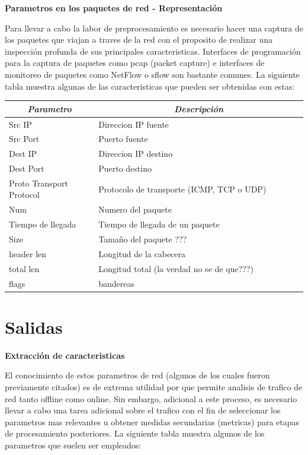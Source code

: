 \documentclass[12pt]{article}
\begin{document}
\textbf{Parametros en los paquetes de red - Representación}


Para llevar a cabo la labor de preprocesamiento es necesario hacer una captura de los paquetes que viajan a traves de la red con el proposito de realizar una inspección profunda de sus principales caracteristicas. Interfaces de programación para la captura de paquetes como pcap (packet capture) e interfaces de monitoreo de paquetes como NetFlow o sflow son bastante comunes. La siguiente tabla muestra algunas de las caracteristicas que pueden ser obtenidas con estas:

\begin{table}[htbp]
\centering
\begin{tabular}{|p{0.3\linewidth}|p{0.7\linewidth}|}
\hline
\multicolumn{1}{|c|}{\textit{\textbf{Parametro}}} & \multicolumn{1}{c|}{\textit{\textbf{Descripción}}} \tabularnewline \hline
Src IP & Direccion IP fuente \tabularnewline \hline
Src Port &  Puerto fuente \tabularnewline \hline  
Dest IP & Direccion IP destino \tabularnewline \hline
Dest Port & Puerto destino \tabularnewline \hline
Proto Transport Protocol & Protocolo de transporte  (ICMP, TCP o UDP)  \tabularnewline \hline
Num & Numero del paquete \tabularnewline \hline
Tiempo de llegada & Tiempo de llegada de un paquete \tabularnewline \hline
Size & Tamaño del paquete ??? \tabularnewline \hline
header len & Longitud de la cabecera \tabularnewline \hline
total len & Longitud total (la verdad no se de que???) \tabularnewline \hline
flags & bandereas \tabularnewline \hline
\end{tabular}
\end{table}

\section{Salidas}

\textbf{Extracción de caracteristicas}

El conocimiento de estos parametros de red (algunos de los cuales fueron previamente citados) es de extrema utilidad por que permite analisis de trafico de red tanto offline como online. Sin embargo, adicional a este proceso, es necesario llevar a cabo una tarea adicional sobre el trafico con el fin de seleccionar los parametros mas relevantes u obtener medidas secundarias (metricas) para etapas de procesamiento posteriores. La siguiente tabla muestra algunos de los parametros que suelen ser empleados:
\end{document}
